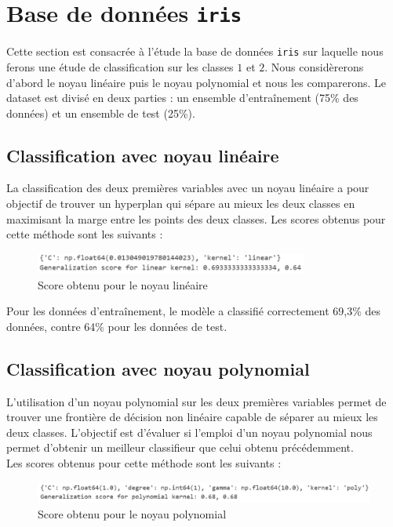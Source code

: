 \documentclass[a4paper,12pt]{article}
\begin{document}
\section{Base de données \texttt{iris}}

Cette section est consacrée à l'étude la base de données \texttt{iris} sur laquelle nous ferons une étude de classification sur les classes $1$ et $2$.
Nous considèrerons d'abord le noyau linéaire puis le noyau polynomial et nous les comparerons.
Le dataset est divisé en deux parties : un ensemble d'entraînement (75\% des données) et un ensemble de test (25\%). 

\subsection{Classification avec noyau linéaire}

La classification des deux premières variables avec un noyau linéaire a pour objectif de trouver un hyperplan qui sépare au mieux les deux classes en maximisant la marge entre les points des deux classes. 
Les scores obtenus pour cette méthode sont les suivants : 

\begin{figure}[H]
    \centering
    \includegraphics[width=0.8\textwidth]{Images/linear_score.png}
    \caption{Score obtenu pour le noyau linéaire}\label{fig : linear}
\end{figure}

Pour les données d'entraînement, le modèle a classifié correctement 69,3\% des données, contre 64\% pour les données de test. 


\subsection{Classification avec noyau polynomial}

L’utilisation d’un noyau polynomial sur les deux premières variables permet de trouver une frontière de décision non linéaire capable de séparer au mieux les deux classes. 
L'objectif est d'évaluer si l'emploi d'un noyau polynomial nous permet d'obtenir un meilleur classifieur que celui obtenu précédemment.\\
Les scores obtenus pour cette méthode sont les suivants :

\begin{figure}[H]
    \centering
    \includegraphics[width=\textwidth]{Images/poly_score.png}
    \caption{Score obtenu pour le noyau polynomial}\label{fig : poly}
\end{figure}
\end{document}
